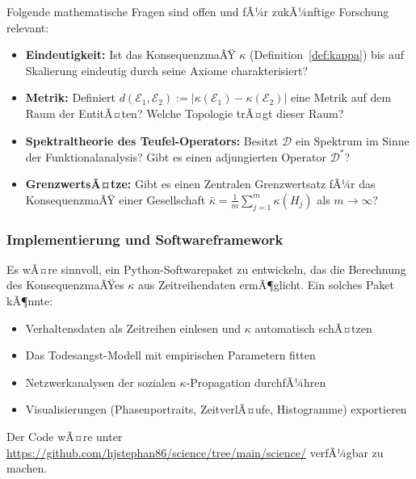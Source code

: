 ﻿\documentclass[a4paper,12pt]{article}
\theoremstyle{definition}
\begin{document}
Folgende mathematische Fragen sind offen und fÃ¼r zukÃ¼nftige Forschung relevant:
\begin{itemize}
\item \textbf{Eindeutigkeit:} Ist das KonsequenzmaÃŸ $\kappa$ (Definition~\ref{def:kappa}) bis auf Skalierung eindeutig durch seine Axiome charakterisiert?
\item \textbf{Metrik:} Definiert $d(\mathcal{E}_1, \mathcal{E}_2) := |\kappa(\mathcal{E}_1) - \kappa(\mathcal{E}_2)|$ eine Metrik auf dem Raum der EntitÃ¤ten? Welche Topologie trÃ¤gt dieser Raum?
\item \textbf{Spektraltheorie des Teufel-Operators:} Besitzt $\mathcal{D}$ ein Spektrum im Sinne der Funktionalanalysis? Gibt es einen adjungierten Operator $\mathcal{D}^*$?
\item \textbf{GrenzwertsÃ¤tze:} Gibt es einen Zentralen Grenzwertsatz fÃ¼r das KonsequenzmaÃŸ einer Gesellschaft $\bar{\kappa} = \frac{1}{m} \sum_{j=1}^m \kappa(H_j)$ als $m \to \infty$?
\end{itemize}

\subsubsection{Implementierung und Softwareframework}

Es wÃ¤re sinnvoll, ein Python-Softwarepaket zu entwickeln, das die Berechnung des KonsequenzmaÃŸes $\kappa$ aus Zeitreihendaten ermÃ¶glicht. Ein solches Paket kÃ¶nnte:
\begin{itemize}
\item Verhaltensdaten als Zeitreihen einlesen und $\kappa$ automatisch schÃ¤tzen
\item Das Todesangst-Modell mit empirischen Parametern fitten
\item Netzwerkanalysen der sozialen $\kappa$-Propagation durchfÃ¼hren
\item Visualisierungen (Phasenportraits, ZeitverlÃ¤ufe, Histogramme) exportieren
\end{itemize}
Der Code wÃ¤re unter \url{https://github.com/hjstephan86/science/tree/main/science/} verfÃ¼gbar zu machen.
\end{document}
